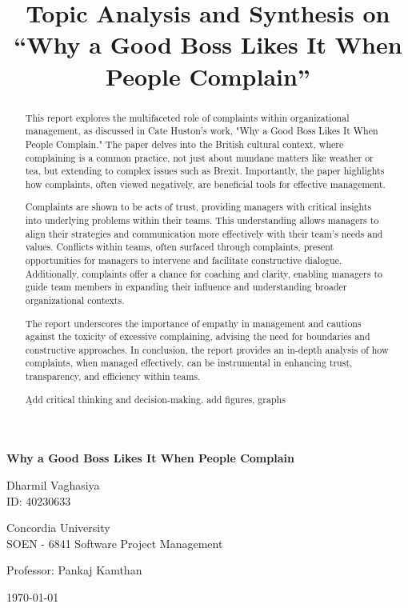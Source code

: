 \documentclass[runningheads]{llncs}
\title{Topic Analysis and Synthesis on\\ ``Why a Good Boss Likes It When People
Complain''}
\begin{document}
%
\begin{titlepage}
    \centering
    \vspace*{1cm}
    
    \Large
    \textbf{Why a Good Boss Likes It When People Complain}
    
    \vspace{1.5cm}
    \normalsize
    Dharmil Vaghasiya\\
    ID: 40230633
    
    \vspace{1cm}
    Concordia University\\
    SOEN - 6841 Software Project Management
    
    \vspace{1.5cm}
    \normalsize
    Professor: Pankaj Kamthan
    
    \vfill
    \today %
\end{titlepage}

\setcounter{tocdepth}{2}
\tableofcontents

\newpage
\begin{abstract}
This report explores the multifaceted role of complaints within organizational management, as discussed in Cate Huston's work, "Why a Good Boss Likes It When People Complain." The paper delves into the British cultural context, where complaining is a common practice, not just about mundane matters like weather or tea, but extending to complex issues such as Brexit. Importantly, the paper highlights how complaints, often viewed negatively, are beneficial tools for effective management. 

Complaints are shown to be acts of trust, providing managers with critical insights into underlying problems within their teams. This understanding allows managers to align their strategies and communication more effectively with their team's needs and values. Conflicts within teams, often surfaced through complaints, present opportunities for managers to intervene and facilitate constructive dialogue. Additionally, complaints offer a chance for coaching and clarity, enabling managers to guide team members in expanding their influence and understanding broader organizational contexts.

The report underscores the importance of empathy in management and cautions against the toxicity of excessive complaining, advising the need for boundaries and constructive approaches. In conclusion, the report provides an in-depth analysis of how complaints, when managed effectively, can be instrumental in enhancing trust, transparency, and efficiency within teams.

\vspace{4cm}

\b{Add critical thinking and decision-making. add figures, graphs}


\end{abstract}
\newpage
\end{document}
